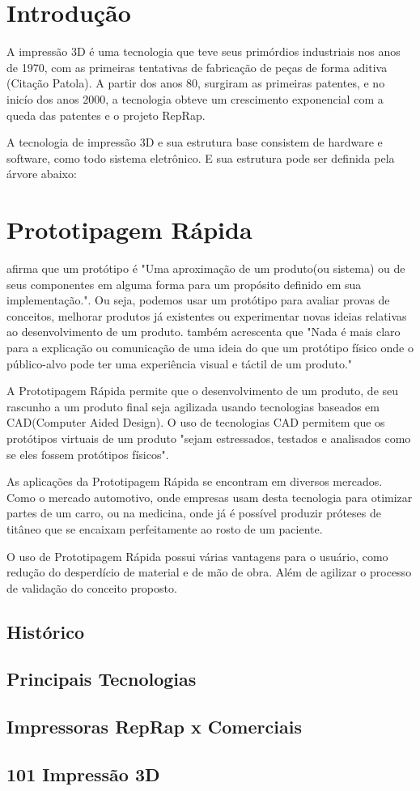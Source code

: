 \section{Introdução}
A impressão 3D é uma tecnologia que teve seus primórdios industriais nos anos de 1970,
com as primeiras tentativas de fabricação de peças de forma aditiva (Citação Patola).
A partir dos anos 80, surgiram as primeiras patentes, e no inicío dos anos 2000,
a tecnologia obteve um crescimento exponencial com a queda das patentes e o projeto RepRap.

A tecnologia de impressão 3D e sua estrutura base consistem de hardware e software,
como todo sistema eletrônico. E sua estrutura pode ser definida pela árvore abaixo:
\newline



\newpage

\section{Prototipagem Rápida}
\citet{rapidproto} afirma que um protótipo é "Uma aproximação de um produto(ou sistema)
ou de seus componentes em alguma forma para um propósito definido em sua implementação.".
Ou seja, podemos usar um protótipo para avaliar provas de conceitos, melhorar produtos
já existentes ou experimentar novas ideias relativas ao desenvolvimento de um produto.
\citet{rapidproto} também acrescenta que "Nada é mais claro para a explicação ou comunicação
de uma ideia do que um protótipo físico onde o público-alvo pode ter uma experiência visual
e táctil de um produto."

A Prototipagem Rápida permite que o desenvolvimento de um produto, de seu rascunho
a um produto final seja agilizada usando tecnologias baseados em CAD(Computer Aided Design).
O uso de tecnologias CAD permitem que os protótipos virtuais de um produto
\citet{rapidproto} "sejam estressados, testados e analisados como se eles fossem protótipos físicos".

As aplicações da Prototipagem Rápida se encontram em diversos mercados. Como o mercado
automotivo, onde empresas usam desta tecnologia para otimizar partes de um carro, ou na medicina,
onde já é possível produzir próteses de titâneo que se encaixam perfeitamente ao rosto de um paciente.

O uso de Prototipagem Rápida possui várias vantagens para o usuário, como redução do desperdício
de material e de mão de obra. Além de agilizar o processo de validação do conceito proposto.

\subsection{Histórico}
\subsection{Principais Tecnologias}
\subsection{Impressoras RepRap x Comerciais}
\subsection{101 Impressão 3D}
